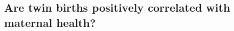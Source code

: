 \documentclass[9pt,letterpaper,subeqn]{beamer}
\begin{document}
\subsection{Are twin births positively correlated with maternal health?}


\frame{
\vspace{5mm}

}


\begin{frame}[label=USA2]

\end{frame}



\begin{frame}[label=USA1]

\end{frame}


\begin{frame}[label=Scotland]

\end{frame}



\begin{frame}[label=Chile]

\end{frame}


\begin{frame}[label=Spain2]

\end{frame}

\begin{frame}[label=UK]
 
\end{frame}



\end{document}
